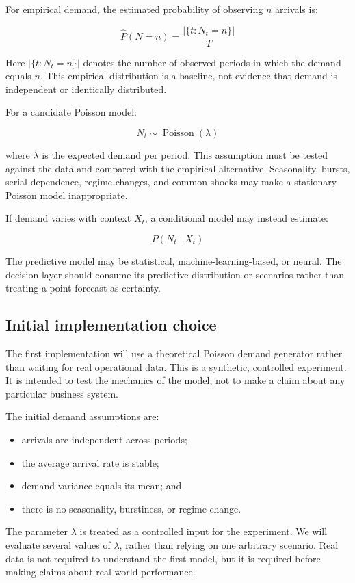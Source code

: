 \documentclass[11pt,a4paper]{article}
\newcommand{\equationnote}[1]{\begin{center}\colorbox{boxblue}{\parbox{0.92\linewidth}{\begin{equation*}#1\end{equation*}}}\end{center}}
\begin{document}
For empirical demand, the estimated probability of observing $n$ arrivals is:

\equationnote{\widehat{P}(N=n) = \frac{\left|\{t : N_t=n\}\right|}{T}}

Here $\left|\{t : N_t=n\}\right|$ denotes the number of observed periods in which the demand equals $n$. This empirical distribution is a baseline, not evidence that demand is independent or identically distributed.

For a candidate Poisson model:

\equationnote{N_t \sim \operatorname{Poisson}(\lambda)}

where $\lambda$ is the expected demand per period. This assumption must be tested against the data and compared with the empirical alternative. Seasonality, bursts, serial dependence, regime changes, and common shocks may make a stationary Poisson model inappropriate.

If demand varies with context $X_t$, a conditional model may instead estimate:

\equationnote{P(N_t \mid X_t)}

The predictive model may be statistical, machine-learning-based, or neural. The decision layer should consume its predictive distribution or scenarios rather than treating a point forecast as certainty.

\subsection{Initial implementation choice}

The first implementation will use a theoretical Poisson demand generator rather than waiting for real operational data. This is a synthetic, controlled experiment. It is intended to test the mechanics of the model, not to make a claim about any particular business system.

The initial demand assumptions are:
\begin{itemize}
  \item arrivals are independent across periods;
  \item the average arrival rate is stable;
  \item demand variance equals its mean; and
  \item there is no seasonality, burstiness, or regime change.
\end{itemize}

The parameter $\lambda$ is treated as a controlled input for the experiment. We will evaluate several values of $\lambda$, rather than relying on one arbitrary scenario. Real data is not required to understand the first model, but it is required before making claims about real-world performance.
\end{document}
